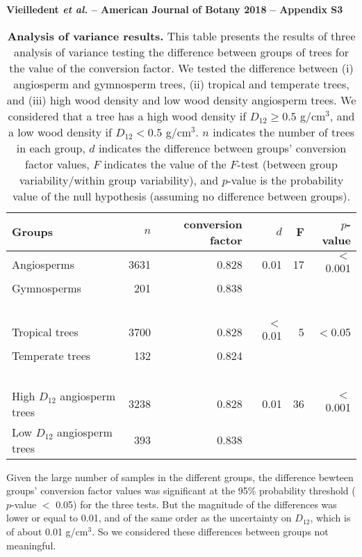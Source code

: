 \documentclass[a4paper, 12pt, leqno, dvipsnames]{article}\usepackage[]{graphicx}\usepackage[]{color}
\title{}
\author{}
\date{}
\begin{document}
\thispagestyle{empty} %
\begin{center}
\textbf{Vieilledent \emph{et al.} -- American Journal of Botany 2018 -- Appendix S3}
\end{center}

\setcounter{table}{2}
\renewcommand{\tablename}{Appendix}
\renewcommand{\thetable}{S\arabic{table}}
\renewcommand{\theHtable}{Appendix.\thetable}

\vspace{1cm}

\begin{longtable}{@{}L{6cm}rrrrr@{}}
  \caption{\textbf{Analysis of variance results.} This table presents the results of three analysis of variance testing the difference between groups of trees for the value of the conversion factor. We tested the difference between (i) angiosperm and gymnosperm trees, (ii) tropical and temperate trees, and (iii) high wood density and low wood density angiosperm trees. We considered that a tree has a high wood density if $D_{12} \geq 0.5$ g/cm$^3$, and a low wood density if $D_{12} < 0.5$ g/cm$^3$. $n$ indicates the number of trees in each group, $d$ indicates the difference between groups' conversion factor values, $F$ indicates the value of the $F$-test (between group variability/within group variability), and $p$-value is the probability value of the null hypothesis (assuming no difference between groups).}\label{sm:anova}\\
  \toprule
  Groups & $n$ & conversion factor & $d$ & F & $p$-value \\
  \midrule
  Angiosperms	& 3631 & 0.828 & 0.01	& 17 & $<$0.001 \\
  Gymnosperms	& 201	& 0.838	& ~ & ~ & ~ \\		
  ~ & ~ & ~ & ~ & ~ & ~ \\
  Tropical trees & 3700 & 0.828	& $<$0.01	& 5	& $<$0.05 \\
  Temperate trees	& 132	& 0.824	& ~ & ~ & ~ \\
  ~ & ~ & ~ & ~ & ~ & ~ \\
  High $D_{12}$ angiosperm trees & 3238 & 0.828 & 0.01 & 36 & $<$0.001 \\
  Low $D_{12}$ angiosperm trees & 393 & 0.838 & ~ & ~ & ~ \\
  \bottomrule
\end{longtable}

Given the large number of samples in the different groups, the difference bewteen groups' conversion factor values was significant at the 95\% probability threshold ($p$-value $<$ 0.05) for the three tests. But the magnitude of the differences was lower or equal to 0.01, and of the same order as the uncertainty on $D_{12}$, which is of about 0.01 g/cm$^3$. So we considered these differences between groups not meaningful.
\end{document}
